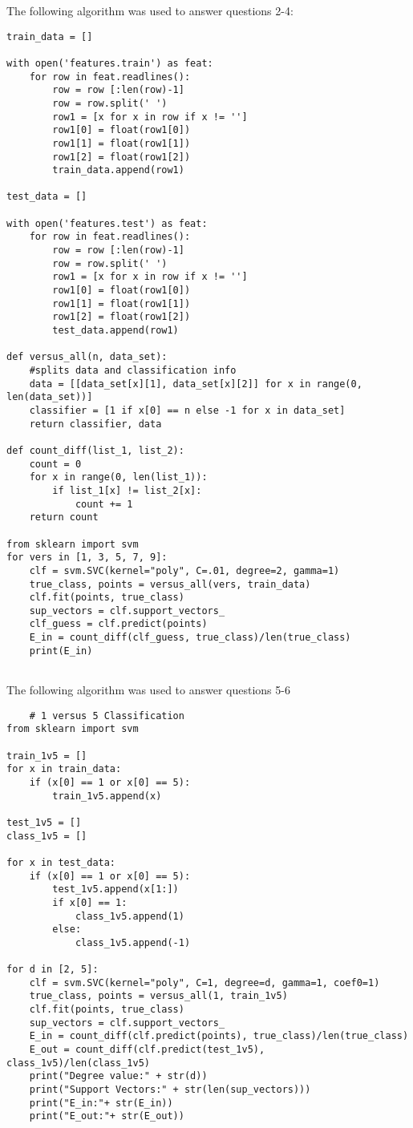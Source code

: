 \documentclass{article}
\begin{document}
\newpage
{\huge The following algorithm was used to answer questions 2-4:}\\
\begin{verbatim}
train_data = []

with open('features.train') as feat:
    for row in feat.readlines():
        row = row [:len(row)-1]
        row = row.split(' ')
        row1 = [x for x in row if x != '']
        row1[0] = float(row1[0])
        row1[1] = float(row1[1])
        row1[2] = float(row1[2])
        train_data.append(row1)

test_data = []

with open('features.test') as feat:
    for row in feat.readlines():
        row = row [:len(row)-1]
        row = row.split(' ')
        row1 = [x for x in row if x != '']
        row1[0] = float(row1[0])
        row1[1] = float(row1[1])
        row1[2] = float(row1[2])
        test_data.append(row1)
        
def versus_all(n, data_set):
    #splits data and classification info
    data = [[data_set[x][1], data_set[x][2]] for x in range(0, len(data_set))]
    classifier = [1 if x[0] == n else -1 for x in data_set]
    return classifier, data

def count_diff(list_1, list_2):
    count = 0
    for x in range(0, len(list_1)):
        if list_1[x] != list_2[x]:
            count += 1
    return count
    
from sklearn import svm
for vers in [1, 3, 5, 7, 9]:
    clf = svm.SVC(kernel="poly", C=.01, degree=2, gamma=1)
    true_class, points = versus_all(vers, train_data)
    clf.fit(points, true_class)  
    sup_vectors = clf.support_vectors_
    clf_guess = clf.predict(points)
    E_in = count_diff(clf_guess, true_class)/len(true_class)
    print(E_in)
    
\end{verbatim}

\newpage
{\huge The following algorithm was used to answer questions 5-6}
\begin{verbatim}
    # 1 versus 5 Classification
from sklearn import svm

train_1v5 = []
for x in train_data:
    if (x[0] == 1 or x[0] == 5):
        train_1v5.append(x)
        
test_1v5 = []
class_1v5 = []

for x in test_data:
    if (x[0] == 1 or x[0] == 5):
        test_1v5.append(x[1:])
        if x[0] == 1:
            class_1v5.append(1)
        else:
            class_1v5.append(-1)            

for d in [2, 5]:
    clf = svm.SVC(kernel="poly", C=1, degree=d, gamma=1, coef0=1)
    true_class, points = versus_all(1, train_1v5)
    clf.fit(points, true_class)  
    sup_vectors = clf.support_vectors_
    E_in = count_diff(clf.predict(points), true_class)/len(true_class)
    E_out = count_diff(clf.predict(test_1v5), class_1v5)/len(class_1v5)
    print("Degree value:" + str(d))
    print("Support Vectors:" + str(len(sup_vectors)))
    print("E_in:"+ str(E_in))
    print("E_out:"+ str(E_out))
\end{verbatim}
\end{document}
